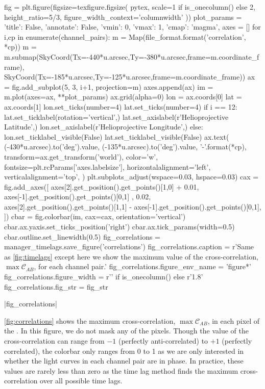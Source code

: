 \begin{pycode}
fig = plt.figure(figsize=texfigure.figsize(
    pytex,
    scale=1 if is_onecolumn() else 2,
    height_ratio=5/3,
    figure_width_context='columnwidth'
))
plot_params = {
    'title': False, 
    'annotate': False,
    'vmin': 0,
    'vmax': 1,
    'cmap': 'magma',
}
axes = []
for i,cp in enumerate(channel_pairs):
    m = Map(file_format.format('correlation', *cp))
    m = m.submap(SkyCoord(Tx=-440*u.arcsec,Ty=-380*u.arcsec,frame=m.coordinate_frame),
                 SkyCoord(Tx=-185*u.arcsec,Ty=-125*u.arcsec,frame=m.coordinate_frame))
    ax = fig.add_subplot(5, 3, i+1, projection=m)
    axes.append(ax)
    im = m.plot(axes=ax, **plot_params)
    ax.grid(alpha=0)
    lon = ax.coords[0]
    lat = ax.coords[1]
    lon.set_ticks(number=4)
    lat.set_ticks(number=4) 
    if i == 12:
        lat.set_ticklabel(rotation='vertical',)
        lat.set_axislabel(r'Helioprojective Latitude',)
        lon.set_axislabel(r'Helioprojective Longitude',)
    else:
        lon.set_ticklabel_visible(False)
        lat.set_ticklabel_visible(False)
    ax.text(
        (-430*u.arcsec).to('deg').value,
        (-135*u.arcsec).to('deg').value,
        '{}-{}'.format(*cp),
        transform=ax.get_transform('world'),
        color='w',
        fontsize=plt.rcParams['axes.labelsize'],
        horizontalalignment='left',
        verticalalignment='top',
    )
plt.subplots_adjust(wspace=0.03, hspace=0.03)
cax = fig.add_axes([
    axes[2].get_position().get_points()[1,0] + 0.01,
    axes[-1].get_position().get_points()[0,1] ,
    0.02,
    axes[2].get_position().get_points()[1,1] - axes[-1].get_position().get_points()[0,1], 
])
cbar = fig.colorbar(im, cax=cax, orientation='vertical')
cbar.ax.yaxis.set_ticks_position('right')
cbar.ax.tick_params(width=0.5)
cbar.outline.set_linewidth(0.5)
fig_correlations = manager_timelags.save_figure('correlations')
fig_correlations.caption = r'Same as \autoref{fig:timelags} except here we show the maximum value of the cross-correlation, $\max\mathcal{C}_{AB}$, for each channel pair.'
fig_correlations.figure_env_name = 'figure*'
fig_correlations.figure_width = r'\columnwidth' if is_onecolumn() else r'1.8\columnwidth'
fig_correlations.fig_str = fig_str
\end{pycode}
|fig_correlations|

\autoref{fig:correlations} shows the maximum cross-correlation, $\max\mathcal{C}_{AB}$, in each pixel of the \AR{}.
In this figure, we do not mask any of the pixels. Though the value of the cross-correlation can range from $-1$ (perfectly anti-correlated) to $+1$ (perfectly correlated), the colorbar only ranges from 0 to 1 as we are only interested in whether the light curves in each channel pair are in phase.
In practice, these values are rarely less than zero as the time lag method finds the maximum cross-correlation over all possible time lags.

